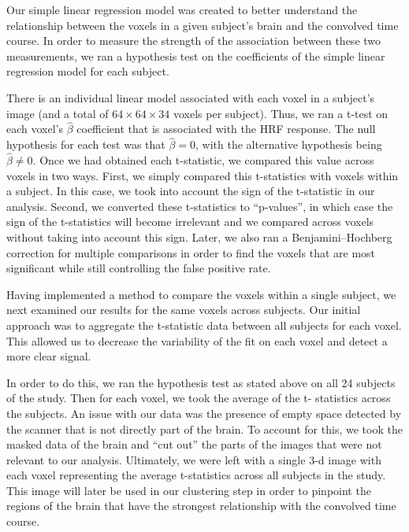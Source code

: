 \par \indent Our simple linear regression model was created to better 
understand the relationship between the voxels in a given subject's brain and 
the convolved time course. In order to measure the strength of the association 
between these two measurements, we ran a hypothesis test on the coefficients of 
the simple linear regression model for each subject. 

\par There is an individual linear model associated with each voxel in a 
subject’s image (and a total of $64 \times 64 \times 34$ voxels per subject). 
Thus, we ran a t-test on each voxel's $\hat{\beta}$ coefficient that is 
associated with the HRF response. The null hypothesis for each test was that 
$\hat{\beta} = 0$, with the alternative hypothesis being $\hat{\beta} \neq 0$. 
Once we had obtained each t-statistic, we compared this value across voxels in 
two ways. First, we simply compared this t-statistics with voxels within a 
subject. In this case, we took into account the sign of the t-statistic in our 
analysis. Second, we converted these t-statistics to ``p-values'', in which case 
the sign of the t-statistics will become irrelevant and we compared across voxels 
without taking into account this sign. Later, we also ran a Benjamini–Hochberg 
correction for multiple comparisons in order to find the voxels that are most 
significant while still controlling the false positive rate. 

\par Having implemented a method to compare the voxels within a single subject, 
we next examined our results for the same voxels across subjects. Our initial 
approach was to aggregate the t-statistic data between all subjects for each 
voxel. This allowed us to decrease the variability of the fit on each voxel and 
detect a more clear signal. 

\par In order to do this, we ran the hypothesis test as stated above on all 24 
subjects of the study. Then for each voxel, we took the average of the t-
statistics across the subjects. An issue with our data was the presence of 
empty space detected by the scanner that is not directly part of the brain. To 
account for this, we took the masked data of the brain and ``cut out'' the parts 
of the images that were not relevant to our analysis. Ultimately, we were left with 
a single 3-d image with each voxel representing the average t-statistics across 
all subjects in the study. This image will later be used in our clustering step in 
order to pinpoint the regions of the brain that have the strongest relationship 
with the convolved time course. 
